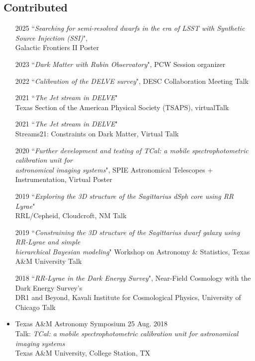 \documentclass[11pt,letterpaper, sans]{moderncv}        %
\begin{document}
\subsection{Contributed}
\begin{itemize} [itemsep=1pt, leftmargin=28pt] %
\item [2025] ``\textit{Searching for semi-resolved dwarfs in the era of LSST with Synthetic Source Injection (SSI)}", \\Galactic Frontiers II \hfill Poster
\item [2023] ``\textit{Dark Matter with Rubin Observatory}", PCW \hfill Session organizer
\item [2022] ``\textit{Calibration of the DELVE survey}", DESC Collaboration Meeting \hfill Talk
\item[2021] ``\textit{The Jet stream in DELVE}" \\
Texas Section of the American Physical Society (TSAPS), virtual\hfill Talk

\item[2021] ``\textit{The Jet stream in DELVE}" \\
Streams21: Constraints on Dark Matter, Virtual \hfill Talk

\item[2020] ``\textit{Further development and testing of TCal: a mobile spectrophotometric calibration unit for\\ astronomical imaging systems}", 
SPIE Astronomical Telescopes + Instrumentation, Virtual \hfill Poster

\item[2019] ``\textit{Exploring the 3D structure of the Sagittarius dSph core using RR Lyrae}"\\
RRL/Cepheid, Cloudcroft, NM  \hfill Talk
 
\item[2019] ``\textit{Constraining the 3D structure of the Sagittarius dwarf galaxy using RR-Lyrae and simple\\ hierarchical
Bayesian modeling}" Workshop on Astronomy \& Statistics, Texas A\&M University \hfill Talk

\item [2018] ``\textit{RR-Lyrae in the Dark Energy Survey}",
Near-Field Cosmology with the Dark Energy Survey's\\
DR1 and Beyond, Kavali Institute for Cosmological Physics, University of Chicago \hfill Talk 

\item Texas A\&M Astronomy Symposium \hfill 25 Aug. 2018 \\
Talk: \textit{TCal: a mobile spectrophotometric calibration unit for astronomical imaging systems} \\
Texas A\&M University, College Station, TX


\end{itemize}
\end{document}
